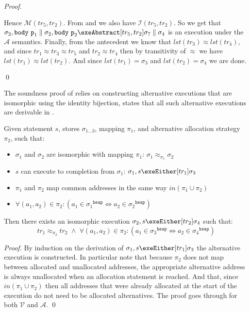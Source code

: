 \documentclass[runningheads,a4paper]{llncs}
\DeclareMathOperator{\band}{\bm{\;\land\;}}
\DeclareMathOperator{\suchthat}{:}
\newcommand*{\qvars}[2]{#1_{#2}}
\newcommand*{\last}[1]{\mathit{lst}(#1)}
\newcommand{\tr}{tr}
\newcommand*\iso{\approx}
\newcommand*{\parcomp}{\parallel}
\newcommand*\Asemantics{\mathcal{A}}
\newcommand*\asemantics{$\Asemantics$ semantics}
\newcommand*\Vsemantics{\mathcal{V}}
\newcommand*{\body}{\mathtt{body}}
\newcommand*{\fun}{\texttt{p}}
\newcommand*{\bijection}[1]{\mathit{in}{\left(#1\right)}}
\newcommand*{\isoR}{\mathcal{I}}
\newcommand*{\mutR}{\mathcal{M}}
\newcommand*{\store}{\sigma}
\newcommand*{\heapof}[1]{{#1}^{\mathtt{heap}}}
\begin{document}
\begin{proof}
\begin{itemize}
Hence $\mutR(\tr_5,\tr_2)$. From \tagfive{} and \tagsix{} we also have $\isoR(\tr_5,\tr_2)$. So we get that $\store_2,\body~\fun_1\parcomp\store_2,\body~\fun_2\exeAbstract[\tr_5,\tr_2]\store_7\parcomp\store_4$ is an execution under the \asemantics{}.
%
Finally, from the antecedent we know that $\last{\tr_3}\iso\last{\tr_4}$, and since $\tr_1\iso\tr_3\iso\tr_5$ and $\tr_2\iso\tr_4$ then by transitivity of $\iso$ we have $\last{\tr_1}\iso\last{\tr_2}$. And since $\last{\tr_1}=\store_3$ and $\last{\tr_2}=\store_4$ we are done.
%
\end{itemize}\qed\end{proof}

The soundness proof of  relies on constructing alternative executions that are isomorphic using the identity bijection,  states that all such alternative executions are derivable in \lang{}.

\begin{lemma}\label{lem:sufficient non-determinism}\setlength{\parindent}{0cm}
Given statement $s$, stores $\qvars{\store}{1 \ldots 3}$, mapping $\pi_1$, and alternative allocation strategy $\qvars{\pi}{2}$, such that:
\begin{itemize}
	\item $\store_1$ and $\store_2$ are isomorphic with mapping $\pi_1$: $\store_1 \iso_{\pi_1} \store_2$
	\item $s$ can execute to completion from $\store_1$: $\store_1,s\exeEither[\tr_1]\store_3$
	\item $\pi_1$ and $\pi_2$ map common addresses in the same way $\bijection{\pi_1 \cup \pi_2}$
	\item %
		$\forall (a_1,a_2) \in \pi_2 \suchthat (a_1 \in \heapof{\store_1} \iff a_2 \in \heapof{\store_2})$
\end{itemize}

Then there exists an isomorphic execution $\store_2,s\exeEither[\tr_2]\store_4$ such that:
	\[\tr_1 \iso_{\pi_2} \tr_2 \band \forall (a_1,a_2) \in \pi_2 \suchthat (a_1 \in \heapof{\store_3} \iff a_2 \in \heapof{\store_4})\]
\end{lemma}
\begin{proof}By induction on the derivation of $\store_1,s\exeEither[\tr_1]\store_3$ the alternative execution is constructed. In particular note that because $\pi_2$ does not map between allocated and unallocated addresses, the appropriate alternative address is always unallocated when an allocation statement is reached. And that, since $\bijection{\pi_1 \cup \pi_2}$ then all addresses that were already allocated at the start of the execution do not need to be allocated alternatives. The proof goes through for both $\Vsemantics$ and $\Asemantics$.
\qed\end{proof}
\end{document}
